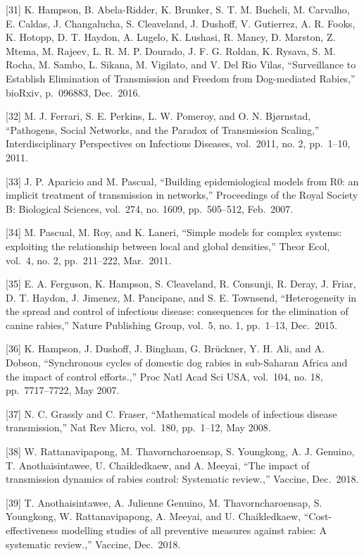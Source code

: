 \documentclass[
  oneside]{book}
\begin{document}
{[}31{]} K. Hampson, B. Abela-Ridder, K. Brunker, S. T. M. Bucheli, M. Carvalho, E. Caldas, J. Changalucha, S. Cleaveland, J. Dushoff, V. Gutierrez, A. R. Fooks, K. Hotopp, D. T. Haydon, A. Lugelo, K. Lushasi, R. Mancy, D. Marston, Z. Mtema, M. Rajeev, L. R. M. P. Dourado, J. F. G. Roldan, K. Rysava, S. M. Rocha, M. Sambo, L. Sikana, M. Vigilato, and V. Del Rio Vilas, ``Surveillance to Establish Elimination of Transmission and Freedom from Dog-mediated Rabies,'' bioRxiv, p.~096883, Dec.~2016.

{[}32{]} M. J. Ferrari, S. E. Perkins, L. W. Pomeroy, and O. N. Bjørnstad, ``Pathogens, Social Networks, and the Paradox of Transmission Scaling,'' Interdisciplinary Perspectives on Infectious Diseases, vol.~2011, no. 2, pp.~1--10, 2011.

{[}33{]} J. P. Aparicio and M. Pascual, ``Building epidemiological models from R0: an implicit treatment of transmission in networks,'' Proceedings of the Royal Society B: Biological Sciences, vol.~274, no. 1609, pp.~505--512, Feb.~2007.

{[}34{]} M. Pascual, M. Roy, and K. Laneri, ``Simple models for complex systems: exploiting the relationship between local and global densities,'' Theor Ecol, vol.~4, no. 2, pp.~211--222, Mar.~2011.

{[}35{]} E. A. Ferguson, K. Hampson, S. Cleaveland, R. Consunji, R. Deray, J. Friar, D. T. Haydon, J. Jimenez, M. Pancipane, and S. E. Townsend, ``Heterogeneity in the spread and control of infectious disease: consequences for the elimination of canine rabies,'' Nature Publishing Group, vol.~5, no. 1, pp.~1--13, Dec.~2015.

{[}36{]} K. Hampson, J. Dushoff, J. Bingham, G. Brückner, Y. H. Ali, and A. Dobson, ``Synchronous cycles of domestic dog rabies in sub-Saharan Africa and the impact of control efforts.,'' Proc Natl Acad Sci USA, vol.~104, no. 18, pp.~7717--7722, May 2007.

{[}37{]} N. C. Grassly and C. Fraser, ``Mathematical models of infectious disease transmission,'' Nat Rev Micro, vol.~180, pp.~1--12, May 2008.

{[}38{]} W. Rattanavipapong, M. Thavorncharoensap, S. Youngkong, A. J. Genuino, T. Anothaisintawee, U. Chaikledkaew, and A. Meeyai, ``The impact of transmission dynamics of rabies control: Systematic review.,'' Vaccine, Dec.~2018.

{[}39{]} T. Anothaisintawee, A. Julienne Genuino, M. Thavorncharoensap, S. Youngkong, W. Rattanavipapong, A. Meeyai, and U. Chaikledkaew, ``Cost-effectiveness modelling studies of all preventive measures against rabies: A systematic review.,'' Vaccine, Dec.~2018.
\end{document}
